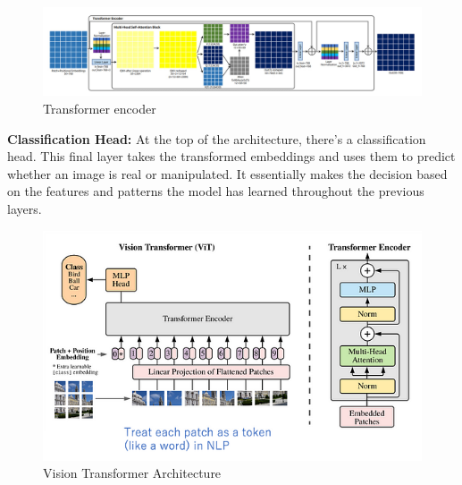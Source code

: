 \begin{figure}[htbp]
    \centering
    \includegraphics[width=6in]{img/encoderdetails.jpg}
    \caption{Transformer encoder}
\end{figure}
\noindent \textbf{Classification Head:} At the top of the architecture, there's a classification head. This final layer takes the transformed embeddings and uses them to predict whether an image is real or manipulated. It essentially makes the decision based on the features and patterns the model has learned throughout the previous layers.
\\

\begin{figure}[htbp]
    \centering
    \includegraphics[width=6in]{img/visiontransformer.png}
    \caption{Vision Transformer Architecture}
\end{figure}

\newpage






